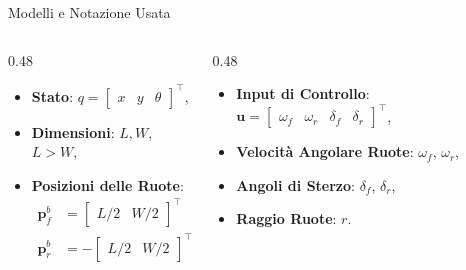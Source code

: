 \begin{frame}{Modelli e Notazione Usata}
\begin{columns}
        \begin{column}{0.48\textwidth}
            \begin{itemize}
                \item \textbf{Stato}: $q=\begin{bmatrix}
                              x & y & \theta
                          \end{bmatrix}^\top$,
                \item \textbf{Dimensioni}: $L,W$, $L>W$,
                \item \textbf{Posizioni delle Ruote}:
                      \vspace{-0.2cm}
                      \begin{align*}
                          \mathbf{p}_f^b & =\begin{bmatrix}
                                                L/2 & W/2
                                            \end{bmatrix}^\top  \\
                          \mathbf{p}_r^b & =-\begin{bmatrix}
                                                 L/2 & W/2
                                             \end{bmatrix}^\top
                      \end{align*}
            \end{itemize}
        \end{column}
        \begin{column}{0.48\textwidth}
            \begin{itemize}
                \item \textbf{Input di Controllo}: $\mathbf{u}=\begin{bmatrix}
                              \omega_f & \omega_r & \delta_f & \delta_r
                          \end{bmatrix}^\top$,
                \item \textbf{Velocità Angolare Ruote}: $\omega_f$, $\omega_r$,
                \item \textbf{Angoli di Sterzo}: $\delta_f$, $\delta_r$,
                \item \textbf{Raggio Ruote}: $r$.
            \end{itemize}
        \end{column}
    \end{columns}
\end{frame}
